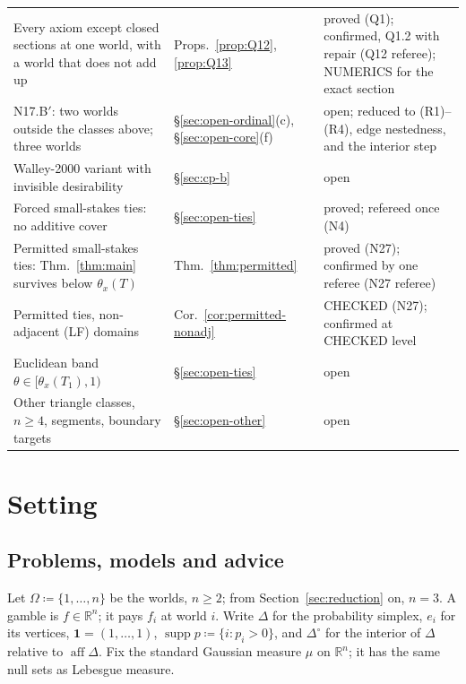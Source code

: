 \documentclass[11pt]{article}
\theoremstyle{definition}
\theoremstyle{remark}
\newcommand{\R}{\mathbb R}
\newcommand{\one}{\mathbf 1}
\newcommand{\Di}{\Delta^{\circ}}
\newcommand{\supp}{\operatorname{supp}}
\newcommand{\aff}{\operatorname{aff}}
\begin{document}
{\begin{longtable}{>{\raggedright\arraybackslash}p{6.4cm}>{\raggedright\arraybackslash}p{2.1cm}>{\raggedright\arraybackslash}p{5.6cm}}
Every axiom except closed sections at one world, with a world that does not add up & Props.~\ref{prop:Q12}, \ref{prop:Q13} & proved (Q1); confirmed, Q1.2 with repair (Q12 referee); NUMERICS for the exact section\\
N17.B$'$: two worlds outside the classes above; three worlds & \S\ref{sec:open-ordinal}(c), \S\ref{sec:open-core}(f) & open; reduced to (R1)--(R4), edge nestedness, and the interior step\\
Walley-2000 variant with invisible desirability & \S\ref{sec:cp-b} & open\\
Forced small-stakes ties: no additive cover & \S\ref{sec:open-ties} & proved; refereed once (N4)\\
Permitted small-stakes ties: Thm.~\ref{thm:main} survives below $\theta_x(T)$ & Thm.~\ref{thm:permitted} & proved (N27); confirmed by one referee (N27 referee)\\
Permitted ties, non-adjacent (LF) domains & Cor.~\ref{cor:permitted-nonadj} & CHECKED (N27); confirmed at CHECKED level\\
Euclidean band $\theta\in[\theta_x(T_1),1)$ & \S\ref{sec:open-ties} & open\\
Other triangle classes, $n\ge4$, segments, boundary targets & \S\ref{sec:open-other} & open\\
\bottomrule
\end{longtable}}

\section{Setting}\label{sec:setting}

\subsection{Problems, models and advice}
Let $\Omega\coloneqq\{1,\dots,n\}$ be the worlds, $n\ge2$; from Section~\ref{sec:reduction} on, $n=3$. A gamble is $f\in\R^n$; it pays $f_i$ at world $i$. Write $\Delta$ for the probability simplex, $e_i$ for its vertices, $\one=(1,\dots,1)$, $\supp p\coloneqq\{i:p_i>0\}$, and $\Di$ for the interior of $\Delta$ relative to $\aff\Delta$. Fix the standard Gaussian measure $\mu$ on $\R^n$; it has the same null sets as Lebesgue measure.
\end{document}
